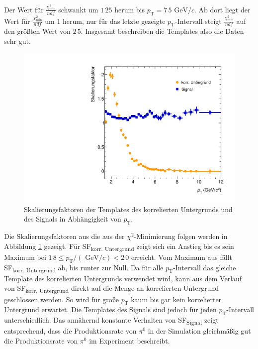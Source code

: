 Der Wert für $\frac{\chi^{2}_\text{min}}{ndf}$ schwankt um $1\,25$ herum bis $p_{\text{T}} = 7\,5\text{ GeV}/c$.
Ab dort liegt der Wert für $\frac{\chi^{2}_\text{min}}{ndf}$ um $1$ herum, nur für das letzte gezeigte $p_{\text{T}}$-Intervall steigt $\frac{\chi^{2}_\text{min}}{ndf}$ auf den größten Wert von $2\,5$.
Insgesamt beschreiben die Templates also die Daten sehr gut.
\begin{figure}[tp]
\centering
\includegraphics[width=.65\linewidth]{SF_Data_2016.pdf}
\caption{Skalierungsfaktoren der Templates des korrelierten Untergrunds und des Signals in Abhängigkeit von $p_{\text{T}}$.
}
\label{fig:SF}
\end{figure}
\newline
Die Skalierungsfaktoren aus die aus der $\chi^{2}$-Minimierung folgen werden in Abbildung \ref{fig:SF} gezeigt.
Für SF\textsubscript{korr. Untergrund} zeigt sich ein Anstieg bis es sein Maximum bei $1\,8 \leq p_{\text{T}}/(\text{ GeV}/c) < 2\,0$ erreicht.
Vom Maximum aus fällt SF\textsubscript{korr. Untergrund} ab, bis runter zur Null.
Da für alle $p_{\text{T}}$-Intervall das gleiche Template des korrelierten Untergrunds verwendet wird, kann aus dem Verlauf von SF\textsubscript{korr. Untergrund} direkt auf die Menge an korrelierten Untergrund geschlossen werden.
So wird für große $p_{\text{T}}$ kaum bis gar kein korrelierter Untergrund erwartet.
\newline
Die Templates des Signals sind jedoch für jeden $p_{\text{T}}$-Intervall unterschiedlich.
Das annähernd konstante Verhalten von SF\textsubscript{Signal} zeigt entsprechend, dass die Produktionsrate von $\pi^{0}$ in der Simulation gleichmäßig gut die Produktionsrate von $\pi^{0}$ im Experiment beschreibt.